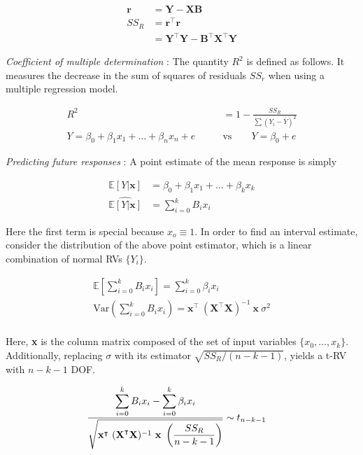 \begin{align}
	\textbf{r} &= \textbf{Y} - \textbf{X} \textbf{B} \\
	SS_R &= \textbf{r}^\intercal \textbf{r} \\
	&= \textbf{Y}^\intercal \textbf{Y} - \textbf{B}^\intercal \textbf{X}^\intercal \textbf{Y}
\end{align}

\textit{Coefficient of multiple determination} : The quantity $ R^2$ is defined as follows. It measures the decrease in the sum of squares of residuals $ SS_r $ when using a multiple regression model.

\begin{align}
	R^2 &= 1 - \frac{SS_R}{\sum (Y_i - \overline{Y})^2}\\
	Y = \beta_0 + \beta_1 x_1 + \dots + \beta_n x_n + e \qquad &\text{vs} \qquad Y = \beta_0 + e
\end{align}

\textit{Predicting future responses} : A point estimate of the mean response is simply 

\begin{align}
	\mathbb{E}[Y|\textbf{x}] &= \beta_0 + \beta_1 x_1 + \dots + \beta_k x_k \nonumber \\
	\widehat{\mathbb{E}[Y|\textbf{x}]} &= \sum\limits_{i = 0}^{k} B_i x_i
\end{align}

Here the first term is special because $ x_o \equiv 1 $. In order to find an interval estimate, consider the distribution of the above point estimator, which is a linear combination of normal RVs $ \{Y_i\} $.

\begin{align}
	\mathbb{E}\left[\sum\limits_{i = 0}^{k} B_i x_i\right] = \sum\limits_{i = 0}^{k} \beta_i x_i \\
	\mathrm{Var}\left(\sum\limits_{i = 0}^{k} B_i x_i\right) = \textbf{x}^\intercal \ (\textbf{X}^\intercal \textbf{X})^{-1}\ \textbf{x}\ \sigma^2 \\
\end{align}

Here, \textbf{x} is the column matrix composed of the set of input variables $ \{x_0, \dots, x_k\} $. Additionally, replacing $ \sigma $ with its estimator $ \sqrt{SS_R / (n-k-1)} $, yields a t-RV with $ n-k-1 $ DOF.

\begin{align}
	\frac{\displaystyle \sum\limits_{i = 0}^{k} B_i x_i - \sum\limits_{i = 0}^{k} \beta_i x_i}{\displaystyle \sqrt{\textbf{x}^\intercal \ (\textbf{X}^\intercal \textbf{X})^{-1}\ \textbf{x}\ \left(\frac{SS_R}{n-k-1}\right)}} &\sim t_{n-k-1}
\end{align}

